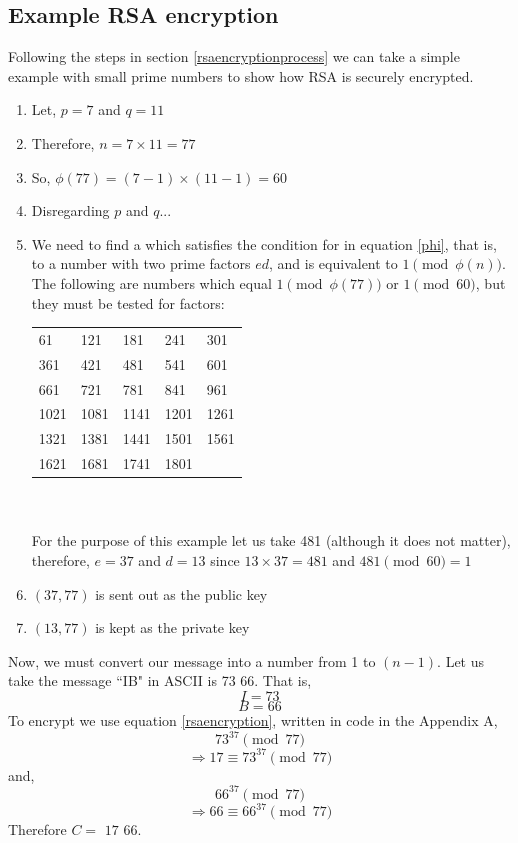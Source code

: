 \documentclass[a4paper,12pt]{article}
\theoremstyle{definition}
\begin{document}
\subsection{Example RSA encryption}
Following the steps in section \ref{rsaencryptionprocess} we can take a simple example with small prime numbers to show how RSA is securely encrypted.
\begin{enumerate}
	\item Let, $p=7$ and $q=11$
	\item Therefore, $n=7 \times 11 = 77$
	\item So, $\phi(77)=(7-1) \times (11-1) = 60$
	\item Disregarding $p$ and $q$...
	\item We need to find a which satisfies the condition for in equation \ref{phi}, that is, to a number with two prime factors $ed$, and is equivalent to $1 \pmod{\phi(n)}$. The following are numbers which equal $1 \pmod{\phi(77)}$ or $1 \pmod{60}$, but they must be tested for factors:
\begin{table}[h]
\centering
\begin{tabular}{lllll}
61  & 121 & 181 & 241 & 301 \\
361 &  421   & 481    & 541    & 601    \\
 661   &  721   &  781   & 841    & 961     \\
1021    & 1081    &1141     & 1201    & 1261 \\
1321 & 1381 & 1441 & 1501 & 1561 \\
1621 & 1681 & 1741 & 1801  
\end{tabular}
\end{table}
	 \\\\ For the purpose of this example let us take 481 (although it does not matter), therefore,  $e=37$ and $d=13$ since $13 \times 37 = 481$ and $481 \pmod{60}=1$
	\item $(37,77)$ is sent out as the public key
	\item $(13,77)$ is kept as the private key
\end{enumerate}
Now, we must convert our message into a number from 1 to $(n-1)$. Let us take the message ``IB" in ASCII is 73 66. That is,
\begin{equation*}
	I=73
\end{equation*}
\begin{equation*}
	B=66
\end{equation*}
To encrypt we use equation \ref{rsaencryption}, written in code in the Appendix A, 
\begin{equation*}
	73^{37} \pmod{77} 
\end{equation*}
\begin{equation*}
	\Rightarrow 17 \equiv 73^{37} \pmod{77} 
\end{equation*}
and,
\begin{equation*}
	66^{37} \pmod{77} 
\end{equation*}
\begin{equation*}
	\Rightarrow 66 \equiv 66^{37} \pmod{77} 
\end{equation*}
Therefore $C = $ $17$ $66$.
\end{document}
